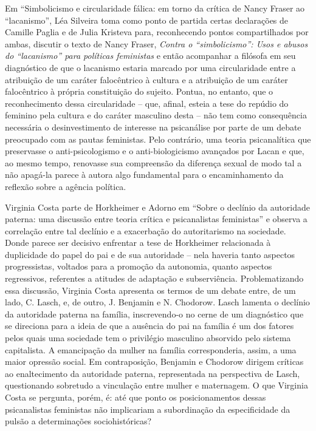 Em ``Simbolicismo e circularidade fálica: em torno da crítica de Nancy
Fraser ao ``lacanismo'', Léa Silveira toma como ponto de partida certas
declarações de Camille Paglia e de Julia Kristeva para, reconhecendo
pontos compartilhados por ambas, discutir o texto de Nancy Fraser,
\emph{Contra o ``simbolicismo'': Usos e abusos do ``lacanismo'' para
políticas feministas} e então acompanhar a filósofa em seu diagnóstico
de que o lacanismo estaria marcado por uma circularidade entre a
atribuição de um caráter falocêntrico à cultura e a atribuição de um
caráter falocêntrico à própria constituição do sujeito. Pontua, no
entanto, que o reconhecimento dessa circularidade -- que, afinal, esteia
a tese do repúdio do feminino pela cultura e do caráter masculino desta
-- não tem como consequência necessária o desinvestimento de interesse
na psicanálise por parte de um debate preocupado com as pautas
feministas. Pelo contrário, uma teoria psicanalítica que preservasse o
anti-psicologismo e o anti-biologicismo avançados por Lacan e que, ao
mesmo tempo, renovasse sua compreensão da diferença sexual de modo tal a
não apagá-la parece à autora algo fundamental para o encaminhamento da
reflexão sobre a agência política.

Virginia Costa parte de Horkheimer e Adorno em ``Sobre o declínio da
autoridade paterna: uma discussão entre teoria crítica e psicanalistas
feministas'' e observa a correlação entre tal declínio e a exacerbação
do autoritarismo na sociedade. Donde parece ser decisivo enfrentar a
tese de Horkheimer relacionada à duplicidade do papel do pai e de sua
autoridade -- nela haveria tanto aspectos progressistas, voltados para a
promoção da autonomia, quanto aspectos regressivos, referentes a
atitudes de adaptação e subserviência. Problematizando essa discussão,
Virginia Costa apresenta os termos de um debate entre, de um lado, C.
Lasch, e, de outro, J. Benjamin e N. Chodorow. Lasch lamenta o declínio
da autoridade paterna na família, inscrevendo-o no cerne de um
diagnóstico que se direciona para a ideia de que a ausência do pai na
família é um dos fatores pelos quais uma sociedade tem o privilégio
masculino absorvido pelo sistema capitalista. A emancipação da mulher na
família corresponderia, assim, a uma maior opressão social. Em
contraposição, Benjamin e Chodorow dirigem críticas ao enaltecimento da
autoridade paterna, representada na perspectiva de Lasch, questionando
sobretudo a vinculação entre mulher e maternagem. O que Virginia Costa
se pergunta, porém, é: até que ponto os posicionamentos dessas
psicanalistas feministas não implicariam a subordinação da
especificidade da pulsão a determinações sociohistóricas?

